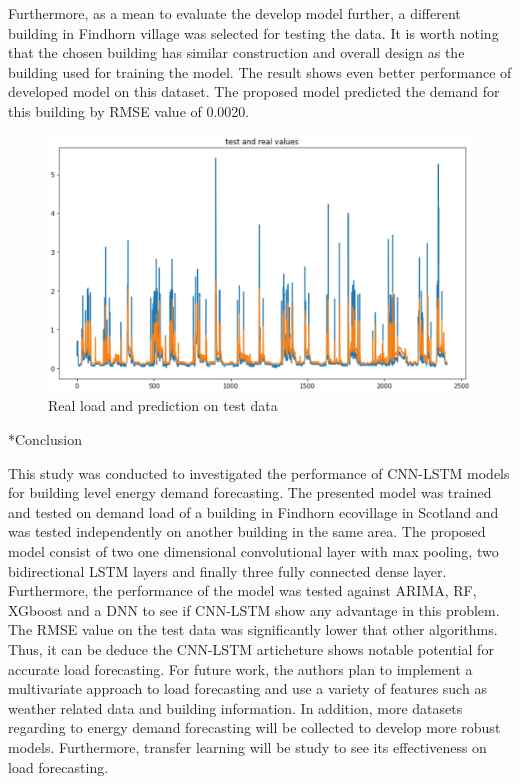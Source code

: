 \documentclass[twocolumn, a4paper,10pt]{article}
\makeatletter
\renewcommand\section{\@startsection{section}{1}{\z@}{0.25cm}{0.1cm}{\normalfont\large\bfseries}}
\makeatother
\begin{document}
Furthermore, as a mean to evaluate the develop model further, a different building in Findhorn village was selected for testing the data. It is worth noting that the chosen building has similar construction and overall design as the building used for training the model. The result shows even better performance of developed model on this dataset. The proposed model predicted the demand for this building by RMSE value of 0.0020.

\begin{figure}[ht]
    \centering
    \includegraphics[scale=0.2]{img/prediction.jpg}
    \caption{Real load and prediction on test data}
    \label{fig:prediction}
\end{figure}

\section*{Conclusion}

This study was conducted to investigated the performance of CNN-LSTM models for building level energy demand forecasting. The presented model was trained and tested on demand load of a building in Findhorn ecovillage in Scotland and was tested independently on another building in the same area. The proposed model consist of two one dimensional convolutional layer with max pooling, two bidirectional LSTM layers and finally three fully connected dense layer. Furthermore, the performance of the model was tested against ARIMA, RF, XGboost and a DNN to see if CNN-LSTM show any advantage in this problem. The RMSE value on the test data was significantly lower that other algorithms. Thus, it can be deduce the CNN-LSTM articheture shows notable potential for accurate load forecasting. For future work, the authors plan to implement a multivariate approach to load forecasting and use a variety of features such as weather related data and building information. In addition, more datasets regarding to energy demand forecasting will be collected to develop more robust models. Furthermore, transfer learning will be study to see its effectiveness on load forecasting.
\end{document}
